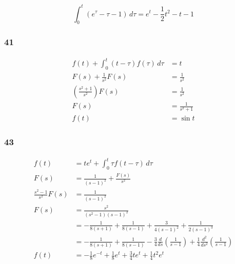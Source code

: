 \documentclass{article}
\begin{document}
\[\int_0^t (e^\tau - \tau - 1) \,d\tau = e^t - \frac{1}{2} t^2 - t - 1\]

\subsubsection{41}

\begin{align*}
  f(t) + \int_0^t (t - \tau) f(\tau) \,d\tau & = t                 \\
  F(s) + \frac{1}{s^2} F(s)                  & = \frac{1}{s^2}     \\
  \left( \frac{s^2 + 1}{s^2} \right) F(s)    & = \frac{1}{s^2}     \\
  F(s)                                       & = \frac{1}{s^2 + 1} \\
  f(t)                                       & = \sin t
\end{align*}

\subsubsection{43}

\begin{align*}
  f(t)                     & = t e^t + \int_0^t \tau f(t - \tau) \,d\tau                                                                                                                            \\
  F(s)                     & = \frac{1}{(s - 1)^2} + \frac{F(s)}{s^2}                                                                                                                               \\
  \frac{s^2 - 1}{s^2} F(s) & = \frac{1}{(s - 1)^2}                                                                                                                                                  \\
  F(s)                     & = \frac{s^2}{(s^2 - 1) (s - 1)^2}                                                                                                                                      \\
                           & = -\frac{1}{8 (s + 1)} + \frac{1}{8 (s - 1)} + \frac{3}{4 (s - 1)^2} + \frac{1}{2 (s - 1)^3}                                                                           \\
                           & = -\frac{1}{8 (s + 1)} + \frac{1}{8 (s - 1)} - \frac{3}{4} \frac{d}{d s} \left( \frac{1}{s - 1} \right) + \frac{1}{4} \frac{d^2}{d s^2} \left( \frac{1}{s - 1} \right) \\
  f(t)                     & = -\frac{1}{8} e^{-t} + \frac{1}{8} e^t + \frac{3}{4} t e^t + \frac{1}{4} t^2 e^t
\end{align*}
\end{document}
